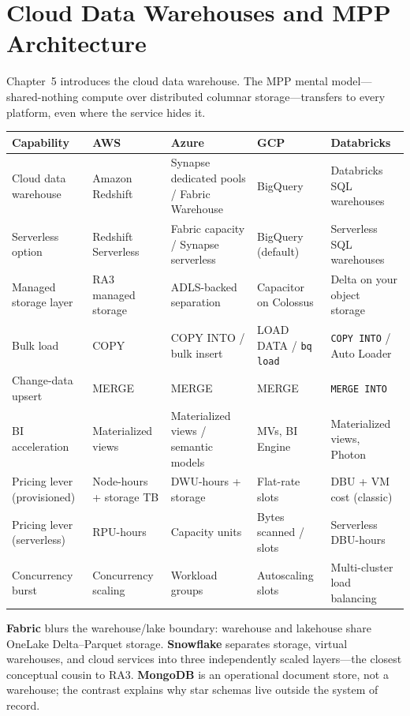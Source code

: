 \section{Cloud Data Warehouses and MPP Architecture}
%
Chapter~5 introduces the cloud data warehouse. The MPP mental model---shared-nothing compute over
distributed columnar storage---transfers to every platform, even where the service hides it.

\begin{center}
\footnotesize
\begin{tabular}{@{}p{2.4cm}p{2.9cm}p{2.9cm}p{2.9cm}p{2.9cm}@{}}
\toprule
\textbf{Capability} & \textbf{AWS} & \textbf{Azure} & \textbf{GCP} & \textbf{Databricks} \\
\midrule
Cloud data warehouse & Amazon Redshift & Synapse dedicated pools / Fabric Warehouse & BigQuery & Databricks SQL warehouses \\
Serverless option & Redshift Serverless & Fabric capacity / Synapse serverless & BigQuery (default) & Serverless SQL warehouses \\
Managed storage layer & RA3 managed storage & ADLS-backed separation & Capacitor on Colossus & Delta on your object storage \\
Bulk load & COPY & COPY INTO / bulk insert & LOAD DATA / \texttt{bq load} & \texttt{COPY INTO} / Auto Loader \\
Change-data upsert & MERGE & MERGE & MERGE & \texttt{MERGE INTO} \\
BI acceleration & Materialized views & Materialized views / semantic models & MVs, BI Engine & Materialized views, Photon \\
\addlinespace
Pricing lever (provisioned) & Node-hours + storage TB & DWU-hours + storage & Flat-rate slots & DBU + VM cost (classic) \\
Pricing lever (serverless) & RPU-hours & Capacity units & Bytes scanned / slots & Serverless DBU-hours \\
Concurrency burst & Concurrency scaling & Workload groups & Autoscaling slots & Multi-cluster load balancing \\
\bottomrule
\end{tabular}
\end{center}

\noindent \textbf{Fabric} blurs the warehouse/lake boundary: warehouse and lakehouse share OneLake
Delta--Parquet storage. \textbf{Snowflake} separates storage, virtual warehouses, and cloud
services into three independently scaled layers---the closest conceptual cousin to RA3.
\textbf{MongoDB} is an operational document store, not a warehouse; the contrast explains why
star schemas live outside the system of record.

